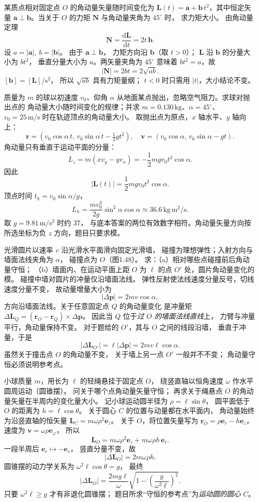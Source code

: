 某质点相对固定点 $O$ 的角动量矢量随时间变化为
$\bm L(t)=\bm a+\bm b\,t^2$，其中恒定矢量
$\bm a\perp\bm b$。当关于 $O$ 的力矩
$\bm N$ 与角动量夹角为 $45^\circ$ 时，
求力矩大小。
\exsolution
由角动量定理
\[
\bm N=\frac{\mathrm d\bm L}{\mathrm dt}=2t\,\bm b.
\]
设 $a=|\bm a|,\ b=|\bm b|$。
由于 $\bm a\perp\bm b$，
力矩方向沿 $\bm b$（取 $t>0$）；
$\bm L$ 沿 $\bm b$ 的分量大小为 $bt^2$，
垂直分量大小为 $a$。两矢量夹角为 $45^\circ$ 意味着
$bt^2=a$，故
\[
\boxed{|\bm N|=2bt=2\sqrt{ab}}.
\]
\excheck $[\bm b]=[\bm L]/\mathrm s^2$，
所以 $\sqrt{ab}$ 具有力矩量纲；
$t<0$ 时只需用 $|t|$，大小结论不变。

质量为 $m$ 的球以初速度 $v_0$、仰角 $\alpha$
从地面某点抛出，忽略空气阻力。求球对抛出点的
角动量大小随时间变化的规律；并求
$m=0.130\,\mathrm{kg}$、$\alpha=45^\circ$、
$v_0=25\,\mathrm{m/s}$ 时在轨迹顶点的角动量大小。
\exsolution
取抛出点为原点，$x$ 轴水平、$y$ 轴向上：
\[
\bm r=(v_0\cos\alpha\,t,\,
v_0\sin\alpha\,t-\tfrac12gt^2),\quad
\bm v=(v_0\cos\alpha,\,v_0\sin\alpha-gt).
\]
角动量只有垂直于运动平面的分量：
\[
L_z=m(xv_y-yv_x)=-\frac12mgv_0t^2\cos\alpha.
\]
因此
\[
\boxed{|\bm L(t)|=\frac12mgv_0t^2\cos\alpha}.
\]
顶点时间 $t_h=v_0\sin\alpha/g$，
\[
\boxed{L_h=\frac{mv_0^3}{2g}\sin^2\alpha\cos\alpha
\simeq36.6\,\mathrm{kg\,m^2/s}}.
\]
\excheck 取 $g=9.81\,\mathrm{m/s^2}$ 时约 $37$，
与底本答案的两位有效数字相符。角动量矢量方向按
所选坐标为负 $z$ 方向，题目只要求模。

光滑圆片以速率 $v$ 沿光滑水平面滑向固定光滑墙，
碰撞为理想弹性；入射方向与墙面法线夹角为 $\alpha$，
碰撞点为 $O$（图1.48）。
求：（a）相对哪些点碰撞前后角动量守恒；
（b）墙面内、在运动平面上距 $O$ 为 $\ell$ 的点 $O'$
处，圆片角动量变化的模。
\exsolution
碰撞中墙对圆片的冲量仅沿墙面法线。
弹性反射使法线速度分量反号，切线速度分量不变，
故动量增量大小为
\[
|\Delta\bm p|=2mv\cos\alpha,
\]
方向沿墙面法线。关于任意固定点 $Q$ 的角动量变化
是冲量矩
$\Delta\bm L_Q=(\bm r_O-\bm r_Q)\times\Delta\bm p$。
因此当 $Q$ 位于\emph{过 $O$ 的墙面法线直线}上，
力臂与冲量平行，角动量保持不变。
对于题给的 $O'$，其与 $O$ 之间的线段沿墙，
垂直于冲量，于是
\[
\boxed{|\Delta\bm L_{O'}|
=\ell|\Delta\bm p|=2mv\ell\cos\alpha}.
\]
\excheck 虽然关于撞击点 $O$ 的角动量不变，
关于墙上另一点 $O'$ 一般并不不变；
角动量守恒必须说明参考点。

小球质量 $m$，用长为 $\ell$ 的轻绳悬挂于固定点 $O$，
绕竖直轴以恒角速度 $\omega$ 作水平圆周运动（圆锥摆）。
问关于哪个点角动量矢量守恒；
再求关于绳悬点 $O$ 的角动量矢量在半周内的变化量大小。
\exsolution
记小球运动圆半径为 $\rho=\ell\sin\theta$，
圆平面低于 $O$ 的距离为 $h=\ell\cos\theta$。
关于圆心 $C$ 的位置与动量都在水平面内，
角动量始终为沿竖直轴的恒矢量
$\bm L_C=m\omega\rho^2\bm e_z$。
关于 $O$，将位置矢量写为
$\bm r_{O}=\rho\bm e_r-h\bm e_z$，速度为
$\bm v=\omega\rho\bm e_\varphi$，
所以
\[
\bm L_O
=m\omega\rho^2\bm e_z+
m\omega\rho h\,\bm e_r .
\]
一段半周后 $\bm e_r\mapsto-\bm e_r$，
竖直分量不变，故
\[
|\Delta\bm L_O|=2m\omega\rho h.
\]
圆锥摆的动力学关系为
$\omega^2\ell\cos\theta=g$，
最终
\[
\boxed{|\Delta\bm L_O|
=\frac{2mg\ell}{\omega}
\sqrt{1-\left(\frac g{\omega^2\ell}\right)^2}}.
\]
\excheck 只要 $\omega^2\ell\ge g$ 才有非退化圆锥摆；
题目所求“守恒的参考点”为\emph{运动圆的圆心} $C$。

